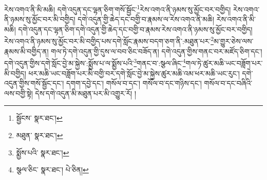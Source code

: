 རེས་འགའ་ནི་མི་མཆི། དགེ་འདུན་དང་ལྷན་ཅིག་གསོ་སྦྱོང་\footnote{སྦྱོངས་  སྣར་ཐང་། }རེས་འགའ་ནི་ཉམས་སུ་མྱོང་བར་བགྱིད། རེས་འགའ་ནི་ཉམས་སུ་མྱོང་བར་མི་བགྱིད། དགེ་འདུན་གྱི་ཆེད་དང་བགྱི་བ་རྣམས་ལ་རེས་འགའ་ནི་མཆི། རེས་འགའ་ནི་མི་མཆི། དགེ་འདུན་དང་ལྷན་ཅིག་དགེ་འདུན་གྱི་ཆེད་དང་བགྱི་བ་རྣམས་རེས་འགའ་ནི་ཉམས་སུ་མྱོང་བར་བགྱིད། རེས་འགའ་ནི་ཉམས་སུ་མྱོང་བར་མི་བགྱིད་པས་དགེ་སློང་རྣམས་བདག་ཅག་ནི་:མཐུན་པར་\footnote{མཐུན་  སྣར་ཐང་། }མ་གྱུར་ཅེས་ལས་རྣམས་མི་བགྱིད་ན། གལ་ཏེ་དགེ་འདུན་གྱི་དུས་ལ་བབ་ཅིང་བཟོད་ན། དགེ་འདུན་གྱིས་གནང་བར་མཛོད་ཅིག་དང་། དགེ་འདུན་གྱིས་དགེ་སློང་བྱེ་མ་སྐྱེས་:སྨྱོས་པ་ལ་སྨྱོས་པའི་\footnote{སྨྱོས་པའི་  སྣར་ཐང་། }གནང་བ་:སྩལ་ཞིང་\footnote{སྩལ་ཅིང་  སྣར་ཐང་།  པེ་ཅིན། }གལ་ཏེ་ཚུར་མཆི་ཡང་བཟློག་པར་མི་བགྱིད། ཕར་མཆི་ཡང་བཟློག་པར་མི་བགྱི་བར་དགེ་སློང་བྱེ་མ་སྐྱེས་ཚུར་མཆི་འམ་ཕར་མཆི་ཡང་རུང་། དགེ་འདུན་གྱིས་གསོ་སྦྱོང་དང་། དགག་དབྱེ་དང་། གསོལ་བ་དང་། གསོལ་བ་དང་གཉིས་དང་། གསོལ་བ་དང་བཞིའི་ལས་བགྱི་སྟེ། དེས་དགེ་འདུན་མི་མཐུན་པར་མི་འགྱུར་རོ། །
